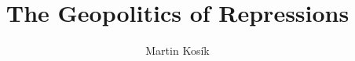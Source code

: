 \usepackage{url}
\usepackage[utf8]{inputenc}
\usepackage{amsmath}
\usepackage{color}
%


\renewcommand{\baselinestretch}{1.5} 
\hoffset -1.54cm \voffset -0.04pt \evensidemargin 1.5cm
\oddsidemargin 2.5cm \topmargin -1.6cm
\textheight 232mm \textwidth 136mm

\newcommand{\noop}[1]{} 



\title{The Geopolitics of Repressions}
\author{Martin Kosík}





\newpage
 \tableofcontents
\newpage
{}

